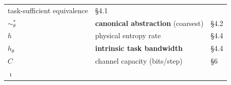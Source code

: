 \documentclass[11pt]{article}
\begin{document}
\begin{longtable}[]{@{}lll@{}}
\begin{minipage}[t]{0.30\columnwidth}
task-sufficient equivalence\strut
\end{minipage} & \begin{minipage}[t]{0.30\columnwidth}\raggedright
\S{}4.1\strut
\end{minipage}\tabularnewline
\begin{minipage}[t]{0.30\columnwidth}\raggedright
\(\sim_\theta^*\)\strut
\end{minipage} & \begin{minipage}[t]{0.30\columnwidth}\raggedright
\textbf{canonical abstraction} (coarsest)\strut
\end{minipage} & \begin{minipage}[t]{0.30\columnwidth}\raggedright
\S{}4.2\strut
\end{minipage}\tabularnewline
\begin{minipage}[t]{0.30\columnwidth}\raggedright
\(h\)\strut
\end{minipage} & \begin{minipage}[t]{0.30\columnwidth}\raggedright
physical entropy rate\strut
\end{minipage} & \begin{minipage}[t]{0.30\columnwidth}\raggedright
\S{}4.4\strut
\end{minipage}\tabularnewline
\begin{minipage}[t]{0.30\columnwidth}\raggedright
\(h_\theta\)\strut
\end{minipage} & \begin{minipage}[t]{0.30\columnwidth}\raggedright
\textbf{intrinsic task bandwidth}\strut
\end{minipage} & \begin{minipage}[t]{0.30\columnwidth}\raggedright
\S{}4.4\strut
\end{minipage}\tabularnewline
\begin{minipage}[t]{0.30\columnwidth}\raggedright
\(C\)\strut
\end{minipage} & \begin{minipage}[t]{0.30\columnwidth}\raggedright
channel capacity (bits/step)\strut
\end{minipage} & \begin{minipage}[t]{0.30\columnwidth}\raggedright
\S{}6\strut
\end{minipage}\tabularnewline
\begin{minipage}[t]{0.30\columnwidth}\raggedright
\(\imath\)\strut
\end{minipage} & \begin{minipage}[t]{0.30\columnwidth}\raggedright

\end{minipage}
\end{longtable}
\end{document}
